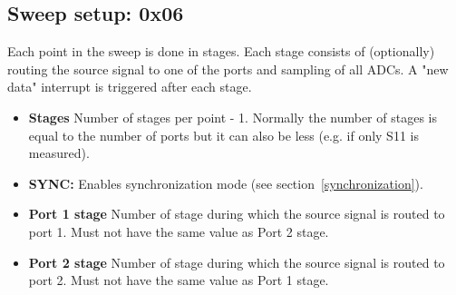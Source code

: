 \documentclass{article}
\newcommand{\bitrect}[2]{
  \begin{pgfonlayer}{foreground}
    \draw [thick] (0,0) rectangle (#1,1);
    \pgfmathsetmacro\result{#1-1}
    \foreach \x in {1,...,\result}
      \draw [thick] (\x,1) -- (\x, 0.8);
  \end{pgfonlayer}
  \bitlabels{#1}{#2}
}
\newcommand{\rwbits}[3]{
  \draw [thick] (#1,0) rectangle ++(#2,1) node[pos=0.5]{#3};
  \pgfmathsetmacro\start{#1+0.5}
  \pgfmathsetmacro\finish{#1+#2-0.5}
}
\newcommand{\robits}[3]{
  \begin{pgfonlayer}{background}
    \draw [thick, fill=lightgray] (#1,0) rectangle ++(#2,1) node[pos=0.5]{#3};
  \end{pgfonlayer}
  \pgfmathsetmacro\start{#1+0.5}
  \pgfmathsetmacro\finish{#1+#2-0.5}
}
\newcommand{\bitlabels}[2]{
  \foreach \bit in {1,...,#1}{
     \pgfmathsetmacro\result{#2}
     \node [above] at (\bit-0.5, 1) {\pgfmathprintnumber{\result}};
   }
}
\begin{document}
\subsection{Sweep setup: 0x06}
Each point in the sweep is done in stages. Each stage consists of (optionally) routing the source signal to one of the ports and sampling of all ADCs. A "new data" interrupt is triggered after each stage.
\label{reg:sweepsetup}
\begin{center}
\end{center}
\begin{itemize}
\item \textbf{Stages} Number of stages per point - 1. Normally the number of stages is equal to the number of ports but it can also be less (e.g. if only S11 is measured).
\item \textbf{SYNC:} Enables synchronization mode (see section~\ref{synchronization}).
\item \textbf{Port 1 stage} Number of stage during which the source signal is routed to port 1. Must not have the same value as Port 2 stage.
\item \textbf{Port 2 stage} Number of stage during which the source signal is routed to port 2. Must not have the same value as Port 1 stage.
\end{itemize}
\end{document}
